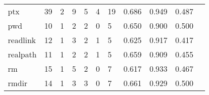 \begin{longtable}{lp{1.20cm}p{1.20cm}p{1.20cm}p{1.20cm}p{1.20cm}p{1.20cm}p{1.20cm}p{1.20cm}p{1.20cm}p{1.20cm}}
ptx       &                                    39 &                                                  2 &                                                  9 &                                                  5 &                                                  4 &                                                 19 &                                         0.686 &                                              0.949 &                                              0.487 \\
pwd       &                                    10 &                                                  1 &                                                  2 &                                                  2 &                                                  0 &                                                  5 &                                         0.650 &                                              0.900 &                                              0.500 \\
readlink  &                                    12 &                                                  1 &                                                  3 &                                                  2 &                                                  1 &                                                  5 &                                         0.625 &                                              0.917 &                                              0.417 \\
realpath  &                                    11 &                                                  1 &                                                  2 &                                                  2 &                                                  1 &                                                  5 &                                         0.659 &                                              0.909 &                                              0.455 \\
rm        &                                    15 &                                                  1 &                                                  5 &                                                  2 &                                                  0 &                                                  7 &                                         0.617 &                                              0.933 &                                              0.467 \\
rmdir     &                                    14 &                                                  1 &                                                  3 &                                                  3 &                                                  0 &                                                  7 &                                         0.661 &                                              0.929 &                                              0.500 \\

\end{longtable}
